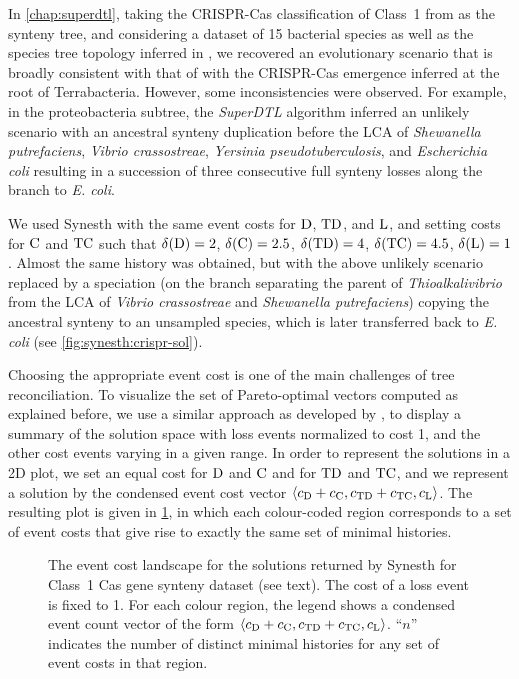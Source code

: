 In \cref{chap:superdtl}, taking the CRISPR-Cas classification of Class~1 from \textcite{Makarova2020EvolutionaryClassificationCRISPR} as the synteny tree, and considering a dataset of 15 bacterial species as well as the species tree topology inferred in \textcite{Coleman2021RootedPhylogenyResolves}, we recovered an evolutionary scenario that is broadly consistent with that of \textcite{Koonin2022EvolutionaryPlasticityFunctional} with the CRISPR-Cas emergence inferred at the root of Terrabacteria.
However, some inconsistencies were observed.
For example, in the proteobacteria subtree, the \emph{SuperDTL} algorithm inferred an unlikely scenario with an ancestral synteny duplication before the LCA of \emph{Shewanella putrefaciens}, \emph{Vibrio crassostreae}, \emph{Yersinia pseudotuberculosis}, and \emph{Escherichia coli} resulting in a succession of three consecutive full synteny losses along the branch to \emph{E. coli}.

We used Synesth with the same event costs for \(\mathrm{D}\), \(\mathrm{TD}\), and \(\mathrm{L}\), and setting costs for \(\mathrm{C}\) and \(\mathrm{TC}\) such that \(\delta\kern.1pt(\mathrm{D}) = 2\), \(\delta\kern.1pt(\mathrm{C}) = 2.5\), \(\delta\kern.1pt(\mathrm{TD}) = 4\), \(\delta\kern.1pt(\mathrm{TC}) = 4.5\), \(\delta\kern.1pt(\mathrm{L}) = 1\).
Almost the same history was obtained, but with the above unlikely scenario replaced by a speciation (on the branch separating the parent of \emph{Thioalkalivibrio} from the LCA of \emph{Vibrio crassostreae} and \emph{Shewanella putrefaciens}) copying the ancestral synteny to an unsampled species, which is later transferred back to \emph{E. coli} (see \cref{fig:synesth:crispr-sol}).

Choosing the appropriate event cost is one of the main challenges of tree reconciliation. 
To visualize the set of Pareto-optimal vectors computed as explained before, we use a similar approach as developed by \textcite{LibeskindHadas2014ParetoOptimalPhylogenetic}, to display a summary of the solution space with loss events normalized to cost 1, and the other cost events varying in a given range. In order to represent the solutions in a 2D plot, we set an equal cost for \(\mathrm{D}\) and \(\mathrm{C}\) and for \(\mathrm{TD}\) and \(\mathrm{TC}\), and we represent a solution by the condensed event cost vector \(\left\langle c_{\mathrm{D}} + c_{\mathrm{C}}, c_{\mathrm{TD}} + c_{\mathrm{TC}}, c_{\mathrm{L}}\right\rangle\).
The resulting plot is given in \cref{fig:synesth:crispr-pareto}, in which each colour-coded region corresponds to a set of event costs that give rise to exactly the same set of minimal histories.

\begin{figure}[h]
    \capstart
    \centering
    
    \caption[Event cost landscape for the set of solutions to the CRISPR-Cas dataset]{
        The event cost landscape for the solutions returned by Synesth for Class~1 Cas gene synteny dataset (see text).
        The cost of a loss event is fixed to 1.
        For each colour region, the legend shows a condensed event count vector of the form \(\left\langle c_{\mathrm{D}} + c_{\mathrm{C}}, c_{\mathrm{TD}} + c_{\mathrm{TC}}, c_{\mathrm{L}}\right\rangle\).
        “\(n\)” indicates the number of distinct minimal histories for any set of event costs in that region.
        \label{fig:synesth:crispr-pareto}
    }
\end{figure}

